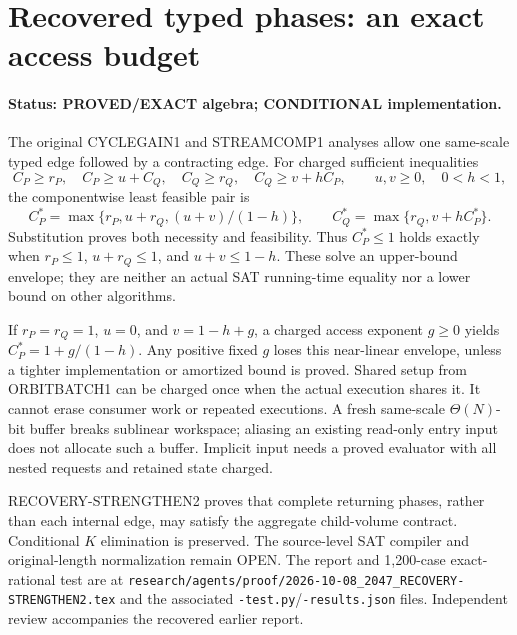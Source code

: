 \section{Recovered typed phases: an exact access budget}
\label{sec:recovery-strengthen2-wrapper}
\paragraph{Status: PROVED/EXACT algebra; CONDITIONAL implementation.}
The original CYCLEGAIN1 and STREAMCOMP1 analyses allow one same-scale
typed edge followed by a contracting edge. For charged sufficient
inequalities
\[
 C_P\ge r_P,\quad C_P\ge u+C_Q,\quad
 C_Q\ge r_Q,\quad C_Q\ge v+hC_P,
 \qquad u,v\ge0,\quad 0<h<1,
\]
the componentwise least feasible pair is
\[
 C_P^*=\max\{r_P,u+r_Q,(u+v)/(1-h)\},\qquad
 C_Q^*=\max\{r_Q,v+hC_P^*\}.
\]
Substitution proves both necessity and feasibility. Thus $C_P^*\le1$
holds exactly when $r_P\le1$, $u+r_Q\le1$, and $u+v\le1-h$.
These solve an upper-bound envelope; they are neither an actual SAT
running-time equality nor a lower bound on other algorithms.

If $r_P=r_Q=1$, $u=0$, and $v=1-h+g$, a charged access exponent
$g\ge0$ yields $C_P^*=1+g/(1-h)$. Any positive fixed $g$ loses this
near-linear envelope, unless a tighter implementation or amortized bound
is proved. Shared setup from ORBITBATCH1 can be charged once when the
actual execution shares it. It cannot erase consumer work or repeated
executions. A fresh same-scale $\Theta(N)$-bit buffer breaks sublinear
workspace; aliasing an existing read-only entry input does not allocate
such a buffer. Implicit input needs a proved evaluator with all nested
requests and retained state charged.

RECOVERY-STRENGTHEN2 proves that complete returning phases, rather than
each internal edge, may satisfy the aggregate child-volume contract.
Conditional $K$ elimination is preserved. The source-level SAT compiler
and original-length normalization remain OPEN. The report and 1,200-case
exact-rational test are at
\nolinkurl{research/agents/proof/2026-10-08_2047_RECOVERY-STRENGTHEN2.tex}
and the associated \nolinkurl{-test.py}/\nolinkurl{-results.json} files.
Independent review accompanies the recovered earlier report.
